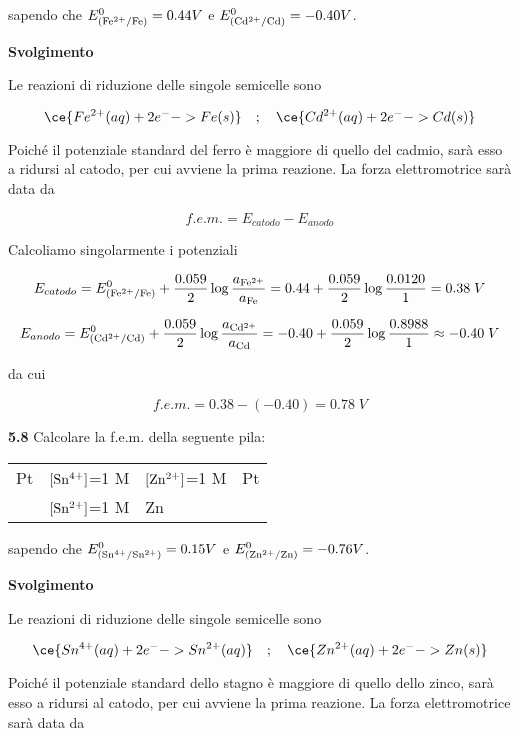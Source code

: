 sapendo che $E^0_{(\rm Fe^{2+}/Fe)}=0.44V$ e $E^0_{(\rm Cd^{2+}/Cd)}=-0.40V$.

\vspace{0.2cm}\large\textbf{Svolgimento}\normalsize

\vspace{0.2cm}Le reazioni di riduzione delle singole semicelle sono

$$\ce{Fe^{2+}(aq) + 2 e^- -> Fe(s)}
\quad;\quad
\ce{Cd^{2+}(aq) + 2 e^- -> Cd(s)}$$

Poiché il potenziale standard del ferro è maggiore di quello del cadmio, sarà esso a ridursi al catodo, per cui avviene la prima reazione. La forza elettromotrice sarà data da

$$f.e.m. = E_{catodo} - E_{anodo}$$

Calcoliamo singolarmente i potenziali

$$E_{catodo}
=E^0_{(\rm Fe^{2+}/Fe)} + \frac{0.059}{2} \log \frac{a_{\rm Fe^{2+}}}{a_{\rm Fe}}
=0.44 + \frac{0.059}{2} \log \frac{0.0120}{1}
=0.38\;V$$

$$E_{anodo} = E^0_{(\rm Cd^{2+}/Cd)} + \frac{0.059}{2} \log \frac{a_{\rm Cd^{2+}}}{a_{\rm Cd}}
=-0.40 + \frac{0.059}{2} \log \frac{0.8988}{1}
\approx -0.40\;V$$

da cui

$$f.e.m.=0.38 - (-0.40) = 0.78\;V$$

\vspace{0.2cm}\textbf{5.8} Calcolare la f.e.m. della seguente pila:

\begin{center}
    \begin{tabular}{p{0.6cm}|p{3cm}||p{3cm}|p{1cm}}
        Pt & $[\rm Sn^{4+}]$=1 M & $[\rm Zn^{2+}]$=1 M & Pt\\[0.5ex]
        & $[\rm Sn^{2+}]$=1 M & Zn &\\[0.5ex]
    \end{tabular}
\end{center}

sapendo che $E^0_{(\rm Sn^{4+}/Sn^{2+})}=0.15V$ e $E^0_{(\rm Zn^{2+}/Zn)}=-0.76V$.

\vspace{0.2cm}\large\textbf{Svolgimento}\normalsize

\vspace{0.2cm}Le reazioni di riduzione delle singole semicelle sono

$$\ce{Sn^{4+}(aq) + 2 e^- -> Sn^{2+}(aq)}
\quad;\quad
\ce{Zn^{2+}(aq) + 2 e^- -> Zn(s)}$$

Poiché il potenziale standard dello stagno è maggiore di quello dello zinco, sarà esso a ridursi al catodo, per cui avviene la prima reazione. La forza elettromotrice sarà data da

